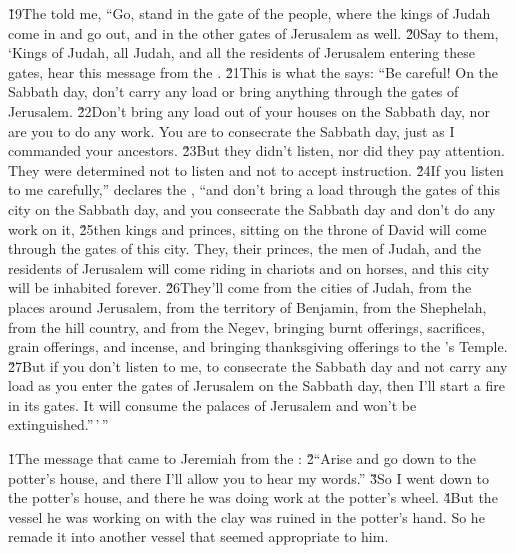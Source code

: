 \v{19}The  told me, ``Go, stand in the gate of the people, where the kings of Judah come in and go out, and in the other gates of Jerusalem as well. \v{20}Say to them, `Kings of Judah, all Judah, and all the residents of Jerusalem entering these gates, hear this message from the . \v{21}This is what the  says: ``Be careful! On the Sabbath day, don't carry any load or bring anything through the gates of Jerusalem. \v{22}Don't bring any load out of your houses on the Sabbath day, nor are you to do any work. You are to consecrate the Sabbath day, just as I commanded your ancestors. \v{23}But they didn't listen, nor did they pay attention. They were determined not to listen and not to accept instruction. \v{24}If you listen to me carefully,'' declares the , ``and don't bring a load through the gates of this city on the Sabbath day, and you consecrate the Sabbath day and don't do any work on it, \v{25}then kings and princes, sitting on the throne of David will come through the gates of this city. They, their princes, the men of Judah, and the residents of Jerusalem will come riding in chariots and on horses, and this city will be inhabited forever. \v{26}They'll come from the cities of Judah, from the places around Jerusalem, from the territory of Benjamin, from the Shephelah, from the hill country, and from the Negev, bringing burnt offerings, sacrifices, grain offerings, and incense, and bringing thanksgiving offerings to the 's Temple. \v{27}But if you don't listen to me, to consecrate the Sabbath day and not carry any load as you enter the gates of Jerusalem on the Sabbath day, then I'll start a fire in its gates. It will consume the palaces of Jerusalem and won't be extinguished.''\,'\,''

\v{1}The message that came to Jeremiah from the : \v{2}``Arise and go down to the potter's house, and there I'll allow you to hear my words.'' \v{3}So I went down to the potter's house, and there he was doing work at the potter's wheel. \v{4}But the vessel he was working on with the clay was ruined in the potter's hand. So he remade it into another vessel that seemed appropriate to him.

